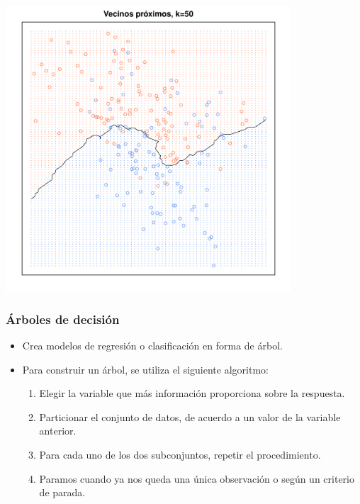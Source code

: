 \documentclass{beamer}
\begin{document}
\begin{frame}
\begin{center}
\includegraphics[width=0.8\textwidth]{knn50.pdf}
\end{center}
\end{frame}

\begin{frame}
\frametitle{Árboles de decisión}

\begin{itemize}
\item Crea modelos de regresión o clasificación en forma de árbol.
\item Para construir un árbol, se utiliza el siguiente algoritmo:
\begin{enumerate}
\item Elegir la variable que más información proporciona sobre la respuesta.
\item Particionar el conjunto de datos, de acuerdo a un valor de la variable anterior.
\item Para cada uno de los dos subconjuntos, repetir el procedimiento.
\item Paramos cuando ya nos queda una única observación o según un criterio de parada.
\end{enumerate}
\end{itemize}
\end{frame}
\end{document}
